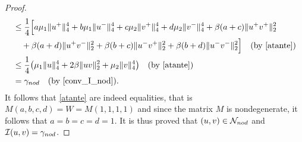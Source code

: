 \documentclass[10pt,a4paper]{amsart}
\numberwithin{equation}{section}
\begin{document}
\begin{proof}
\begin{align*}
&\leq \frac{1}{4}  \Big[ a \mu_1 \|u^+\|_4^4  + b \mu_1 \|u^-\|_4^4
 + c \mu_2 \|v^+\|_4^4   + d \mu_2 \|v^-\|_4^4
 + \beta (a+c) \|u^+v^+\|_2^2  \\
&\quad + \beta (a+d) \|u^+v^-\|_2^2
 + \beta (b+c)\|u^-v^+\|_2^2  + \beta (b+d) \|u^-v^-\|_2^2
  \Big] \quad  \text{(by \eqref{atante})} \\
&\leq \frac{1}{4}  \big(\mu_1  \|u\|_4^4 +  2\beta\|uv\|_2^2
 + \mu_2 \|v\|_4^4 \big) \quad  \text{(by \eqref{atante})} \\
&= \gamma_{\rm nod}\quad \text{(by \eqref{conv_I_nod})} .
\end{align*}
It follows that \eqref{atante} are indeed equalities, that is
$M(a,b,c,d)=W= M(1,1,1,1)$
and since the matrix $M$ is nondegenerate, it follows that  $a=b=c=d=1$.
It is thus proved that $(u,v)\in \mathcal N_{\rm nod}$ and
$\mathcal I(u,v)=\gamma_{\rm nod}$.
\smallskip


\end{proof}
\end{document}
